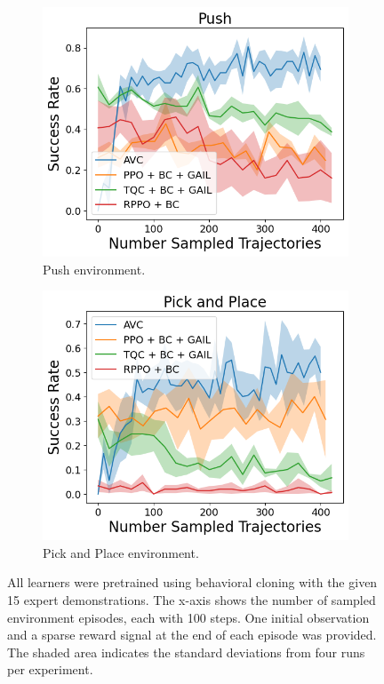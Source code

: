 \begin{figure}[htbp]
    \begin{subfigure}[b]{0.45\textwidth}
      \includegraphics[width=\textwidth]{images/15_400/Push.png}
      \caption{Push environment.}
    \end{subfigure}
    \hfill
    \begin{subfigure}[b]{0.45\textwidth}
      \includegraphics[width=\textwidth]{images/15_400/Pick and Place.png}
      \caption{Pick and Place environment.}
    \end{subfigure}
    \caption{All learners were pretrained using behavioral cloning with the given 15 expert demonstrations. 
    The x-axis shows the number of sampled environment episodes, each with 100 steps.  One initial observation and a sparse reward signal at the end of each episode was provided. 
    The shaded area indicates the standard deviations from four runs per experiment.}
\end{figure}

